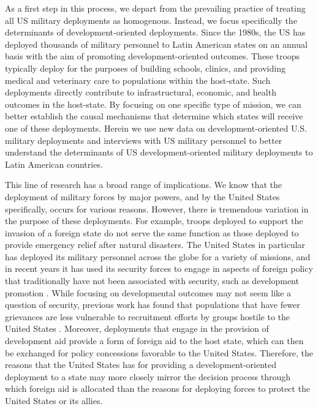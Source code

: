 \documentclass[12pt]{article}
\begin{document}
\begin{doublespace}
As a first step in this process, we depart from the prevailing practice of treating all US military deployments as homogenous. Instead, we focus specifically the determinants of development-oriented deployments. Since the 1980s, the US has deployed thousands of military personnel to Latin American states on an annual basis with the aim of promoting development-oriented outcomes. These troops typically deploy for the purposes of building schools, clinics, and providing medical and veterinary care to populations within the host-state. Such deployments directly contribute to infrastructural, economic, and health outcomes in the host-state. By focusing on one specific type of mission, we can better establish the causal mechanisms that determine which states will receive one of these deployments.  Herein we use new data on development-oriented U.S. military deployments and interviews with US military personnel to better understand the determinants of US development-oriented military deployments to Latin American countries. 

This line of research has a broad range of implications. We know that the deployment of military forces by major powers, and by the United States specifically, occurs for various reasons. However, there is tremendous variation in the purpose of these deployments. For example, troops deployed to support the invasion of a foreign state do not serve the same function as those deployed to provide emergency relief after natural disasters. The United States in particular has deployed its military personnel across the globe for a variety of missions, and in recent years it has used its security forces to engage in aspects of foreign policy that  traditionally have not been associated with security, such as development promotion \cite{howell2009changing,Heinrichetal2016,aning2010security}.  While focusing on developmental outcomes may not seem like a question of security, previous work has found that populations that have fewer grievances are less vulnerable to recruitment efforts by groups hostile to the United States \cite{scott2011sponsoring,young2011can,Heinrichetal2016,de2005quality,finkel2007effects}.  Moreover, deployments that engage in the provision of development aid provide a form of foreign aid to the host state, which can then be exchanged for policy concessions favorable to the United States.  Therefore, the reasons that the United States has for providing a development-oriented deployment to a state may more closely mirror the decision process through which foreign aid is allocated than the reasons for deploying forces to protect the United States or its allies. 


\end{doublespace}
\end{document}
